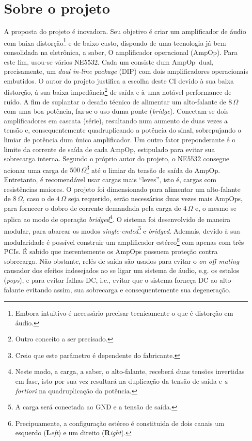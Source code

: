\documentclass[12pt, a4paper, leqno, twoside]{book}
\def\ohm{\,\Omega}
\def\ampop{AmpOp}
\begin{document}
  \section{Sobre o projeto} 
  A proposta do projeto \'e inovadora. Seu objetivo \'e criar um amplificador de \'audio com baixa distor\c c\~ao\footnote{Embora intuitivo \'e necess\'ario precisar tecnicamente o que \'e distor\c c\~ao em \'audio.} e de baixo custo, dispondo de uma tecnologia j\'a bem consolidada na eletr\^onica, a saber, O amplificador operacional (\ampop). Para este fim, usou-se v\'arios NE5532. Cada um consiste dum \ampop\ dual, precisamente, um {\it dual in-line package} (DIP) com dois amplificadores operacionais embutidos. O autor do projeto justifica a escolha deste CI devido \`a sua baixa distor\c c\~ao, \`a sua baixa imped\^ancia\footnote{Outro conceito a ser precisado.} de sa\'ida e \`a uma not\'avel performance de ru\'ido. A fim de suplantar o desafio t\'ecnico de alimentar um alto-falante de $8\ohm$ com uma boa pot\^encia, faz-se o uso duma ponte ({\it bridge}). Conectam-se dois amplificadores em cascata (s\'erie), resultando num aumento de duas vezes a tens\~ao e, consequentemente quadruplicando a pot\^encia do sinal, sobrepujando o limiar de pot\^encia dum \'unico amplificador. Um outro fator preponderante \'e o limite da corrente de sa\'ida de cada \ampop, estipulado para evitar sua sobrecarga interna. Segundo o pr\'oprio autor do projeto, o NE5532 consegue acionar uma carga de $500\ohm$\footnote{Creio que este par\^ametro \'e dependente do fabricante.} at\'e o limiar da tens\~ao de sa\'ida do \ampop. Entretanto, \'e recomend\'avel usar cargas mais ``leves'', isto \'e, cargas com resist\^encias maiores. O projeto foi dimensionado para alimentar um alto-falante de $8\ohm$, caso o de $4\ohm$ seja requerido, ser\~ao necess\'arios duas vezes mais \ampop{s}, para fornecer o dobro de corrente demandada pela carga de $4\ohm$ e, o mesmo se aplica ao modo de opera\c c\~ao {\it bridged\/}\footnote{Neste modo, a carga, a saber, o alto-falante, receber\'a duas tens\~oes invertidas em fase, isto por sua vez resultar\'a na duplica\c c\~ao da tens\~ao de sa\'ida e {\it a fortiori} na quadruplica\c c\~ao da pot\^encia.}. O sistema foi desenvolvido de maneira modular, para abarcar os modos {\it single-ended\/}\footnote{A carga ser\'a conectada ao GND e a tens\~ao de sa\'ida.} e {\it bridged}. Ademais, devido \`a sua modularidade \'e poss\'ivel construir um amplificador est\'ereo\footnote{Precipuamente, a configura\c c\~ao est\'ereo \'e constituida de dois canais um esquerdo ({\bf L}{\it eft}) e um direito ({\bf R}{\it ight}).} com apenas com tr\^es PCIs. \'E sabido que inerentemente os \ampop{s} possuem prote\c c\~ao contra sobrecarga. N\~ao obstante, rel\'es de sa\'ida s\~ao usados para evitar o {\it on-off muting} causador dos efeitos indesejados ao se ligar um sistema de \'audio, e.g. os estalos ({\it pops}), e para evitar falhas DC, i.e., evitar que o sistema forneça DC ao alto-falante evitando assim, sua sobrecarga e consequentemente sua degenera\c c\~ao. 
\end{document}
